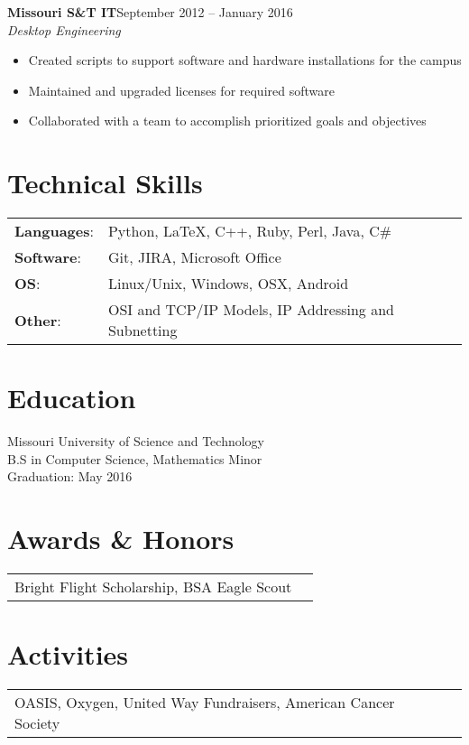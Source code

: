 \documentclass[margin]{res}
\begin{document}
\begin{resume}
    	   \textbf{Missouri S\&T IT}\hfill September 2012 -- January 2016\\
       \textit{Desktop Engineering}\hfill
       \begin{itemize} \itemsep -1pt  %
         \item Created scripts to support software and hardware installations for the campus
         \item Maintained and upgraded licenses for required software
         \item Collaborated with a team to accomplish prioritized goals and objectives
       \end{itemize}

    \section{Technical Skills}
      \begin{tabular}{l p{3.6in}}
        \textbf{Languages}:                   & Python, \LaTeX, C++, Ruby, Perl, Java, C\# \\ [1pt]
        \textbf{Software}:                    & Git, JIRA, Microsoft Office \\ [1pt]

        \textbf{OS}:           & Linux/Unix, Windows, OSX, Android \\ [1pt]
        \textbf{Other}:                       & OSI and TCP/IP Models, IP Addressing and Subnetting \\ [1pt]
      \end{tabular}

    \section{Education}
      Missouri University of Science and Technology \\ 
      B.S in Computer Science, Mathematics Minor \\
      Graduation: May 2016 \\
      
	\section{Awards \& Honors} 
      \begin{tabular}{l p{4in}}
        Bright Flight Scholarship, BSA Eagle Scout \\ [1pt]
      \end{tabular}
      
	\section{Activities} 
      \begin{tabular}{l p{4in}}
        OASIS, Oxygen, United Way Fundraisers, American Cancer Society \\ [1pt]
      \end{tabular}
      
  \end{resume} 
\end{document}
